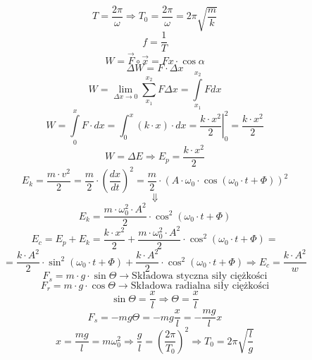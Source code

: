\documentclass{article}
\begin{document}
\begin{enumerate}
		\[
		T = \frac{2 \pi}{\omega} \Longrightarrow T_0 = \frac{2 \pi}{\omega} = 2 \pi \sqrt{\frac{m}{k}}
		\]
		\[
		f = \frac{1}{T}
		\]
		\[
		W = \vec{F} \circ \vec{x} = Fx \cdot \cos \alpha
		\]
		\[
		\Delta W = F \cdot \Delta x
		\]
		\[
		W = \lim\limits_{\Delta x \rightarrow 0} \sum\limits_{x_1}^{x_2} F \Delta x = \int\limits_{x_1}^{x_2} Fdx
		\]
		\[
		W = \int\limits_0^x F \cdot dx = \int_0^x (k \cdot x) \cdot dx = \left. \frac{k \cdot x^2}{2} \right|_0^2 = \frac{k \cdot x^2}{2}
		\]
		\[
		W = \Delta E \Rightarrow E_p = \frac{k \cdot x^2}{2}
		\]
		\[
		E_k = \frac{m \cdot v^2}{2} = \frac{m}{2} \cdot \left( \frac{dx}{dt} \right)^2 = \frac{m}{2} \cdot (A \cdot \omega_0 \cdot \cos(\omega_0 \cdot t + \varPhi))^2 
		\]
		\[
		\Downarrow
		\]
		\[
		E_k = \frac{m \cdot \omega_0^2 \cdot A^2}{2} \cdot \cos^2(\omega_0 \cdot t + \varPhi)
		\]
		\newpage
		\[
		E_c = E_p + E_k = \frac{k \cdot x^2}{2} + \frac{m \cdot \omega_0^2 \cdot A^2}{2} \cdot \cos^2(\omega_0 \cdot t + \varPhi) =
		\]
		\[
		= \frac{k \cdot A^2}{2} \cdot \sin^2(\omega_0 \cdot t + \varPhi) + \frac{k \cdot A^2}{2} \cdot \cos^2(\omega_0 \cdot t + \varPhi) \Rightarrow E_c = \frac{k \cdot A^2}{w}
		\]
		\[
		F_s = m \cdot g \cdot \sin \varTheta \longrightarrow \text{Składowa styczna siły ciężkości}
		\]
		\[
		F_r = m \cdot g \cdot \cos \varTheta \longrightarrow \text{Składowa radialna siły ciężkości}
		\]
		\[
		\sin \varTheta = \frac{x}{l} \Longrightarrow \varTheta = \frac{x}{l}
		\]
		\[
		F_s = -mg\varTheta = -mg \frac{x}{l} = - \frac{mg}{l}x
		\]
		\[
		x = \frac{mg}{l} = m \omega_0^2 \Rightarrow \frac{g}{l} = \left( \frac{2 \pi}{T_0} \right)^2 \Rightarrow T_0 = 2 \pi \sqrt{\frac{l}{g}}
		\]
		
		\renewcommand{\arraystretch}{1.5}
		

\end{enumerate}
\end{document}
